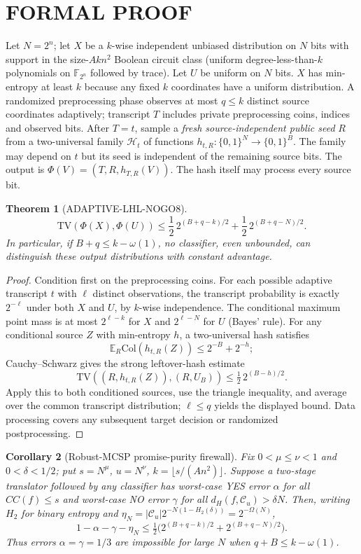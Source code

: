 \documentclass[11pt]{article}
\newtheorem{theorem}{Theorem}
\newtheorem{corollary}[theorem]{Corollary}
\begin{document}
\section*{FORMAL PROOF}
Let $N=2^n$; let $X$ be a $k$-wise independent unbiased distribution on $N$ bits with support in the size-$Akn^2$ Boolean circuit class (uniform degree-less-than-$k$ polynomials on $\mathbb F_{2^n}$ followed by trace). Let $U$ be uniform on $N$ bits. $X$ has min-entropy at least $k$ because any fixed $k$ coordinates have a uniform distribution.
A randomized preprocessing phase observes at most $q\le k$ distinct source coordinates adaptively; transcript $T$ includes private preprocessing coins, indices and observed bits. After $T=t$, sample a \emph{fresh source-independent public seed} $R$ from a two-universal family $\mathcal H_t$ of functions $h_{t,R}:\{0,1\}^N\to\{0,1\}^B$. The family may depend on $t$ but its seed is independent of the remaining source bits. The output is $\Phi(V)=(T,R,h_{T,R}(V))$. The hash itself may process every source bit.
\begin{theorem}[ADAPTIVE-LHL-NOGO8]
\[
\boxed{\mathrm{TV}(\Phi(X),\Phi(U))
\le \frac12\,2^{(B+q-k)/2}
+\frac12\,2^{(B+q-N)/2}.}
\]
In particular, if $B+q\le k-\omega(1)$, no classifier, even unbounded, can distinguish these output distributions with constant advantage.
\end{theorem}
\begin{proof}
Condition first on the preprocessing coins. For each possible adaptive transcript $t$ with $\ell$ distinct observations, the transcript probability is exactly $2^{-\ell}$ under both $X$ and $U$, by $k$-wise independence. The conditional maximum point mass is at most $2^{\ell-k}$ for $X$ and $2^{\ell-N}$ for $U$ (Bayes' rule). For any conditional source $Z$ with min-entropy $h$, a two-universal hash satisfies
\[
\mathbb E_R\mathrm{Col}(h_{t,R}(Z))\le 2^{-B}+2^{-h};
\]
Cauchy--Schwarz gives the strong leftover-hash estimate
\[
\mathrm{TV}((R,h_{t,R}(Z)),(R,U_B))\le\tfrac12\,2^{(B-h)/2}.
\]
Apply this to both conditioned sources, use the triangle inequality, and average over the common transcript distribution; $\ell\le q$ yields the displayed bound. Data processing covers any subsequent target decision or randomized postprocessing.
\end{proof}
\begin{corollary}[Robust-MCSP promise-purity firewall]
Fix $0<\mu\le\nu<1$ and $0<\delta<1/2$; put $s=N^\mu$, $u=N^\nu$, $k=\lfloor s/(An^2)\rfloor$. Suppose a two-stage translator followed by any classifier has worst-case YES error $\alpha$ for all $CC(f)\le s$ and worst-case NO error $\gamma$ for all $d_H(f,\mathcal C_u)>\delta N$. Then, writing $H_2$ for binary entropy and $\eta_N=|\mathcal C_u|2^{-N(1-H_2(\delta))}=2^{-\Omega(N)}$,
\[
\boxed{
1-\alpha-\gamma-\eta_N
\le\tfrac12\bigl(2^{(B+q-k)/2}+2^{(B+q-N)/2}\bigr).
}
\]
Thus errors $\alpha=\gamma=1/3$ are impossible for large $N$ when $q+B\le k-\omega(1)$.
\end{corollary}
\end{document}
